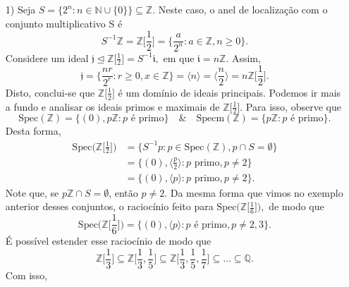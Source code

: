 \documentclass[AlgebraII/algebraII_notes.tex]{subfiles}
\begin{document}
\begin{example}
	\begin{itemize}
		\item[1)] Seja \(S = \{2^{n}: n\in \mathbb{N}\cup\{0\}\}\subseteq \mathbb{Z}\).
		      Neste caso, o anel de localização com o conjunto multiplicativo S é
		      \[
			      S^{-1}\mathbb{Z} = \mathbb{Z}\biggl[\frac{1}{2}\biggr] = \biggl\{\frac{a}{2^{n}}: a\in \mathbb{Z}, n \geq  0\biggr\}.
		      \]
		      Considere um ideal \(\mathfrak{j}\trianglelefteq \mathbb{Z}\biggl[\frac{1}{2}\biggr] = S^{-1}\mathfrak{i}, \) em que \(\mathfrak{i} = n \mathbb{Z}\).
		      Assim,
		      \[
			      \mathfrak{j} = \biggl\{\frac{nr}{2^{r}}:r\geq 0, x\in \mathbb{Z}\biggr\} = \langle n \rangle = \langle \frac{n}{2} \rangle = n \mathbb{Z}\biggl[\frac{1}{2}\biggr].
		      \]
		      Disto, conclui-se que \(\mathbb{Z}\biggl[\frac{1}{2}\biggr]\) é um domínio de ideais principais. Podemos ir mais a fundo e analisar os ideais primos e maximais
		      de \(\mathbb{Z}\biggl[\frac{1}{2}\biggr].\) Para isso, observe que
		      \[
			      \mathrm{Spec}(\mathbb{Z}) = \{(0), p \mathbb{Z}: p \text{ é primo}\} \quad\&\quad \mathrm{Specm}(\mathbb{Z}) = \{p \mathbb{Z}: p \text{ é primo}\}.
		      \]
		      Desta forma,
		      \begin{align*}
			      \mathrm{Spec}\biggl(\mathbb{Z}\biggl[\frac{1}{2}\biggr]\biggr) & = \{S^{-1}p: p\in \mathrm{Spec}(\mathbb{Z}), p\cap S = \emptyset \} \\
			                                                                     & = \{(0), \langle \frac{p}{2} \rangle: p\text{ primo}, p \neq 2\}    \\
			                                                                     & = \{(0), \langle p \rangle: p \text{ primo}, p\neq 2\}.
		      \end{align*}
		      Note que, se \(p \mathbb{Z}\cap S = \emptyset \), então \(p\neq 2\). Da mesma forma que vimos no exemplo anterior desses conjuntos,
		      o raciocínio feito para \(\mathrm{Spec}\biggl(\mathbb{Z}\biggl[\frac{1}{6}\biggr]\biggr),\) de modo que
		      \[
			      \mathrm{Spec}\biggl(\mathbb{Z}\biggl[\frac{1}{6}\biggr]\biggr) = \{(0), \langle p \rangle: p \text{ é primo}, p\neq 2, 3\}.
		      \]
		      É possível estender esse raciocínio de modo que
		      \[
			      \mathbb{Z}\biggl[\frac{1}{3}\biggr]\subseteq \mathbb{Z}\biggl[\frac{1}{3}, \frac{1}{5}\biggr]\subseteq \mathbb{Z}\biggl[\frac{1}{3}, \frac{1}{5}, \frac{1}{7}\biggr]\subseteq \dotsc \subseteq \mathbb{Q}.
		      \]
		      Com isso,

\end{itemize}
\end{example}
\end{document}
